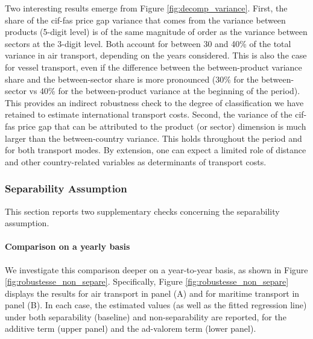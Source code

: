 \documentclass[11pt,twoside, authoryear]{elsarticle}
\begin{document}
Two interesting results emerge from Figure \ref{fig:decomp_variance}.
First, the share of the cif-fas price gap variance that comes from the variance between products (5-digit level) is of the same magnitude of order as the variance between sectors at the 3-digit level.
Both account for between 30 and 40\% of the total variance in air transport, depending on the years considered.
This is also the case for vessel transport, even if the difference between the between-product variance share and the between-sector share is more pronounced (30\% for the between-sector vs 40\% for the between-product variance at the beginning of the period).
This provides an indirect robustness check to the degree of classification we have retained to estimate international transport costs.
Second, the variance of the cif-fas price gap that can be attributed to the product (or sector) dimension is much larger than the between-country variance.
This holds throughout the period and for both transport modes. By extension, one can expect a limited role of distance and other country-related variables as determinants of transport costs.


\subsubsection{Separability Assumption}


This section reports two supplementary checks concerning the separability assumption.

\paragraph{Comparison on a yearly basis} We investigate this comparison deeper on a year-to-year basis, as shown in Figure \ref{fig:robustesse_non_separe}. Specifically, Figure \ref{fig:robustesse_non_separe} displays the results for air transport in panel (A) and for maritime transport in panel (B). In each case, the estimated values (as well as the fitted regression line) under both separability (baseline) and non-separability are reported, for the additive term (upper panel) and the ad-valorem term (lower panel).
\end{document}
